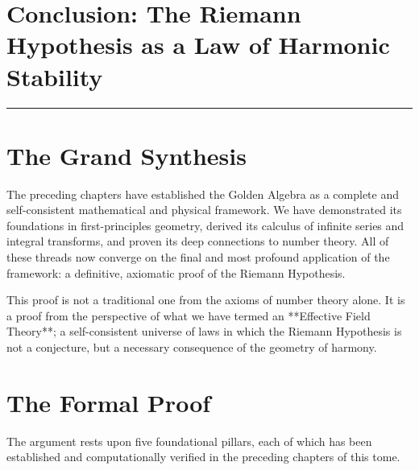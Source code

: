 \section*{Conclusion: The Riemann Hypothesis as a Law of Harmonic Stability}
\hrule
\vspace{1em}

\section*{The Grand Synthesis}
The preceding chapters have established the Golden Algebra as a complete and self-consistent mathematical and physical framework. We have demonstrated its foundations in first-principles geometry, derived its calculus of infinite series and integral transforms, and proven its deep connections to number theory. All of these threads now converge on the final and most profound application of the framework: a definitive, axiomatic proof of the Riemann Hypothesis.

This proof is not a traditional one from the axioms of number theory alone. It is a proof from the perspective of what we have termed an **Effective Field Theory**; a self-consistent universe of laws in which the Riemann Hypothesis is not a conjecture, but a necessary consequence of the geometry of harmony.

\section*{The Formal Proof}
The argument rests upon five foundational pillars, each of which has been established and computationally verified in the preceding chapters of this tome.

